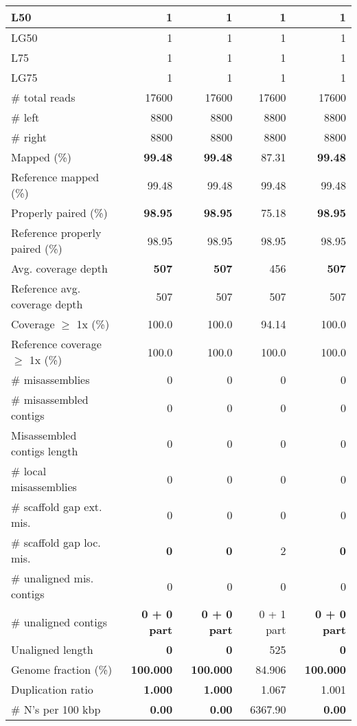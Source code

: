 \documentclass[12pt,a4paper]{article}
\begin{document}
\begin{table}[ht]
\begin{center}
\begin{tabular}{|l*{4}{|r}|}
L50 & 1 & 1 & 1 & 1 \\ \hline
LG50 & 1 & 1 & 1 & 1 \\ \hline
L75 & 1 & 1 & 1 & 1 \\ \hline
LG75 & 1 & 1 & 1 & 1 \\ \hline
\# total reads & 17600 & 17600 & 17600 & 17600 \\ \hline
\# left & 8800 & 8800 & 8800 & 8800 \\ \hline
\# right & 8800 & 8800 & 8800 & 8800 \\ \hline
Mapped (\%) & {\bf 99.48} & {\bf 99.48} & 87.31 & {\bf 99.48} \\ \hline
Reference mapped (\%) & 99.48 & 99.48 & 99.48 & 99.48 \\ \hline
Properly paired (\%) & {\bf 98.95} & {\bf 98.95} & 75.18 & {\bf 98.95} \\ \hline
Reference properly paired (\%) & 98.95 & 98.95 & 98.95 & 98.95 \\ \hline
Avg. coverage depth & {\bf 507} & {\bf 507} & 456 & {\bf 507} \\ \hline
Reference avg. coverage depth & 507 & 507 & 507 & 507 \\ \hline
Coverage $\geq$ 1x (\%) & 100.0 & 100.0 & 94.14 & 100.0 \\ \hline
Reference coverage $\geq$ 1x (\%) & 100.0 & 100.0 & 100.0 & 100.0 \\ \hline
\# misassemblies & 0 & 0 & 0 & 0 \\ \hline
\# misassembled contigs & 0 & 0 & 0 & 0 \\ \hline
Misassembled contigs length & 0 & 0 & 0 & 0 \\ \hline
\# local misassemblies & 0 & 0 & 0 & 0 \\ \hline
\# scaffold gap ext. mis. & 0 & 0 & 0 & 0 \\ \hline
\# scaffold gap loc. mis. & {\bf 0} & {\bf 0} & 2 & {\bf 0} \\ \hline
\# unaligned mis. contigs & 0 & 0 & 0 & 0 \\ \hline
\# unaligned contigs & {\bf 0 + 0 part} & {\bf 0 + 0 part} & 0 + 1 part & {\bf 0 + 0 part} \\ \hline
Unaligned length & {\bf 0} & {\bf 0} & 525 & {\bf 0} \\ \hline
Genome fraction (\%) & {\bf 100.000} & {\bf 100.000} & 84.906 & {\bf 100.000} \\ \hline
Duplication ratio & {\bf 1.000} & {\bf 1.000} & 1.067 & 1.001 \\ \hline
\# N's per 100 kbp & {\bf 0.00} & {\bf 0.00} & 6367.90 & {\bf 0.00} \\ \hline

\end{tabular}
\end{center}
\end{table}
\end{document}
